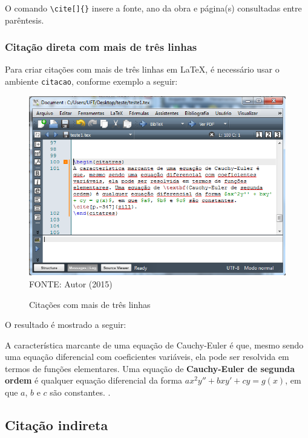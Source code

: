 	O comando \verb!\cite[]{}! insere a fonte, ano da obra e página(s) consultadas entre parêntesis.
	
\subsubsection{Citação direta com mais de três linhas}

Para criar citações com mais de três linhas em LaTeX, é necessário usar o ambiente \texttt{citacao}, conforme exemplo a seguir:
	\begin{figure}[H]
	\centering
	\caption{Citações com mais de três linhas}
	\includegraphics[scale=0.45]
	{img/fig12.png}\label{fig12}\\
	FONTE: Autor (2015)
	\end{figure}
O resultado é mostrado a seguir:
\begin{citacao}
A característica marcante de uma equação de Cauchy-Euler é que, mesmo sendo uma equação diferencial com coeficientes variáveis, ela pode ser resolvida em termos de funções elementares. Uma equação de \textbf{Cauchy-Euler de segunda ordem} é qualquer equação diferencial da forma $ax^2y'' + bxy' + cy = g(x)$, em que $a$, $b$ e $c$ são constantes. \cite[p.~347]{zill}.
\end{citacao}

\subsection{Citação indireta}

